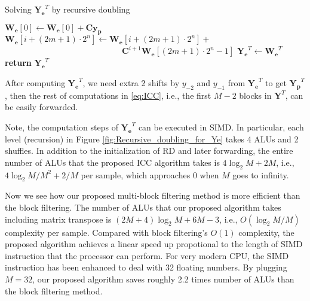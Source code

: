 \begin{algorithm}
    \caption{Solving $\bm{Y_e}^T$ by recursive doubling}\label{recursive_doubling}
    \begin{algorithmic}[1]
            \State $\bm{W_e}[0] \gets \bm{W_e}[0] + \bm{C}\bm{y_p}$ 
              
                 
                     
                            \State $\bm{W_e}[i{+}(2m{+}1){\cdot}2^{n}] \gets \bm{W_e}[i{+}(2m{+}1){\cdot}2^{n}] + $ 
                            \Statex $ \quad\quad\quad\quad\quad\quad\quad\quad\quad\quad\quad\quad\quad\quad \bm{C}^{i{+}1} \bm{W_e}[(2m{+}1){\cdot}2^n{-}1]$ 
                    \EndFor
                \EndFor
            \EndFor
            \State $\bm{Y_e}^T \gets \bm{W_e}^T$
            \State \textbf{return} $\bm{Y_e}^T$ 
        \EndProcedure
    \end{algorithmic}
\end{algorithm}
After computing $\bm{Y_e}^T$, we need extra 2 shifts by $y_{-2}$ and $y_{-1}$ from $\bm{Y_e}^T$ to get $\bm{Y_p}^T$,
then the rest of computations in \eqref{eq:ICC}, i.e., the first $M{-}2$ blocks in $\bm{Y}^T$, can be easily forwarded. 

Note, the computation steps of $\bm{Y_e}^T$ can be executed in SIMD. In particular, each level (recursion)
in Figure \ref{fig:Recursive_doubling_for_Ye} takes 4 ALUs and 2 shuffles. In addition to the initialization of RD 
and later forwarding, the entire number of ALUs that the proposed ICC algorithm takes is $4\log_2M+2M$, i.e., $4\log_2M/M^2+2/M$ per sample, which approaches 0 when $M$ goes to infinity.

Now we see how our proposed multi-block filtering method is more efficient than the block filtering. The number of ALUs that our proposed algorithm takes
including matrix transpose is $(2M{+}4)\log_2M{+}6M{-}3$, i.e., $O(\log_2M/M)$ complexity per sample. Compared with block filtering's $O(1)$ complexity,
the proposed algorithm achieves a linear speed up propotional to the length of SIMD instruction that the processor can perform.
For very modern CPU, the SIMD instruction has been enhanced to deal with 32 floating numbers. By plugging $M{=}32$, our proposed algorithm saves roughly 2.2
times number of ALUs than the block filtering method.










